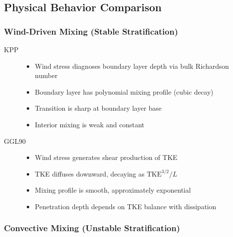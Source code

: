 \documentclass[11pt, a4paper]{article}
\begin{document}
\subsection{Physical Behavior Comparison}

\subsubsection{Wind-Driven Mixing (Stable Stratification)}

\begin{description}
    \item[KPP]
    \begin{itemize}
        \item Wind stress diagnoses boundary layer depth via bulk Richardson number
        \item Boundary layer has polynomial mixing profile (cubic decay)
        \item Transition is sharp at boundary layer base
        \item Interior mixing is weak and constant
    \end{itemize}
    
    \item[GGL90]
    \begin{itemize}
        \item Wind stress generates shear production of TKE
        \item TKE diffuses downward, decaying as $\text{TKE}^{3/2}/L$
        \item Mixing profile is smooth, approximately exponential
        \item Penetration depth depends on TKE balance with dissipation
    \end{itemize}
\end{description}

\subsubsection{Convective Mixing (Unstable Stratification)}
\end{document}
